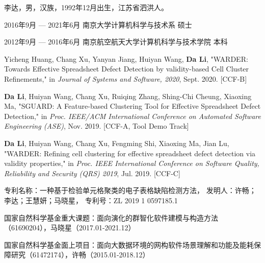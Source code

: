 \begin{resume}

  \begin{authorinfo}
  \noindent 李达，男，汉族，1992年12月出生，江苏省泗洪人。
  \end{authorinfo}

  \begin{education}
  \item[2016年9月 --- 2021年6月] 南京大学计算机科学与技术系 \hfill 硕士
  \item[2012年9月 --- 2016年6月] 南京航空航天大学计算机科学与技术学院 \hfill 本科
  \end{education}

  \begin{publications}
    \item Yicheng Huang, Chang Xu, Yanyan Jiang, Huiyan Wang, \textbf{Da Li}, "WARDER: Towards Effective Spreadsheet Defect Detection by validity-based Cell Cluster Refinements," in \textsl{Journal of Systems and Software, 2020}, Sept. 2020. [CCF-B]
    \item \textbf{Da Li}, Huiyan Wang, Chang Xu, Ruiqing Zhang, Shing-Chi Cheung, Xiaoxing Ma, "SGUARD: A Feature-based Clustering Tool for Effective Spreadsheet Defect Detection," in \textsl{Proc. IEEE/ACM International Conference on Automated Software Engineering (ASE)}, Nov. 2019. [CCF-A, Tool Demo Track]
    \item \textbf{Da Li}, Huiyan Wang, Chang Xu, Fengming Shi, Xiaoxing Ma, Jian Lu, "WARDER: Refining cell clustering for effective spreadsheet defect detection via validity properties," in \textsl{Proc. IEEE International Conference on Software Quality, Reliability and Security (QRS) 2019}, Jul. 2019. [CCF-C]
    \item 专利名称：一种基于检验单元格聚类的电子表格缺陷检测方法，
    发明人：许畅；李达；王慧妍；马晓星，
    专利号：ZL 2019 1 0597185.1
  \end{publications}


  \begin{projects}
    \item 国家自然科学基金重大课题：面向演化的群智化软件建模与构造方法（61690204），马晓星（2017.01-2021.12）
    \item 国家自然科学基金面上项目：面向大数据环境的网构软件场景理解和功能及能耗保障研究（61472174），许畅（2015.01-2018.12）
  \end{projects}

\end{resume}

